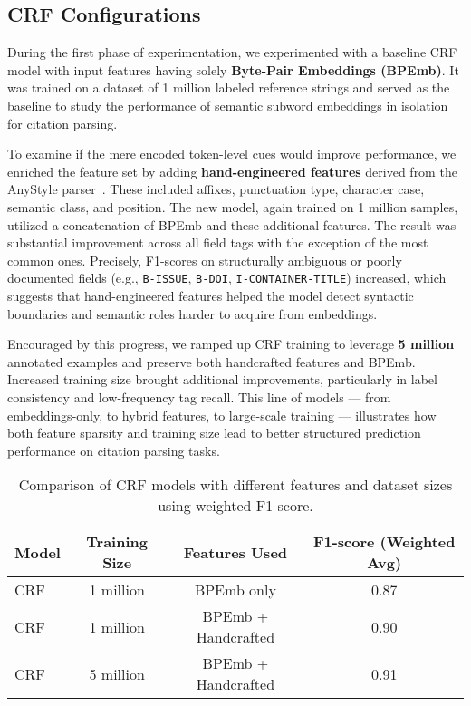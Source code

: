 \subsection{CRF Configurations}
During the first phase of experimentation, we experimented with a baseline CRF model with input features having solely \textbf{Byte-Pair Embeddings (BPEmb)}. It was trained on a dataset of 1 million labeled reference strings and served as the baseline to study the performance of semantic subword embeddings in isolation for citation parsing.

To examine if the mere encoded token-level cues would improve performance, we enriched the feature set by adding \textbf{hand-engineered features} derived from the AnyStyle parser~\cite{anystyle}. These included affixes, punctuation type, character case, semantic class, and position. The new model, again trained on 1 million samples, utilized a concatenation of BPEmb and these additional features.
The result was substantial improvement across all field tags with the exception of the most common ones. Precisely, F1-scores on structurally ambiguous or poorly documented fields (e.g., \texttt{B-ISSUE}, \texttt{B-DOI}, \texttt{I-CONTAINER-TITLE}) increased, which suggests that hand-engineered features helped the model detect syntactic boundaries and semantic roles harder to acquire from embeddings.

Encouraged by this progress, we ramped up CRF training to leverage \textbf{5 million} annotated examples and preserve both handcrafted features and BPEmb. Increased training size brought additional improvements, particularly in label consistency and low-frequency tag recall.
This line of models — from embeddings-only, to hybrid features, to large-scale training — illustrates how both feature sparsity and training size lead to better structured prediction performance on citation parsing tasks.
\begin{table}[h]
    \centering
    \begin{tabular}{|l|c|c|c|}
    \hline
    \textbf{Model} & \textbf{Training Size} & \textbf{Features Used} & \textbf{F1-score (Weighted Avg)} \\
    \hline
    CRF & 1 million & BPEmb only & 0.87 \\
    CRF & 1 million & BPEmb + Handcrafted & 0.90 \\
    CRF & 5 million & BPEmb + Handcrafted & 0.91 \\
    \hline
    \end{tabular}
    \caption[CRF Model Comparison (Features and Sizes)]{Comparison of CRF models with different features and dataset sizes using weighted F1-score.}
    \label{tab:crf_comparison}
\end{table}

